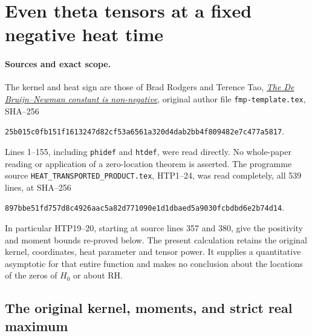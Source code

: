\section{Even theta tensors at a fixed negative heat time}
\label{sec:even-theta-tensor-concentration}

\paragraph{Sources and exact scope.}
The kernel and heat sign are those of Brad Rodgers and Terence Tao,
\href{https://arxiv.org/abs/1801.05914v5}{\emph{The De Bruijn--Newman
constant is non-negative}}, original author file
\nolinkurl{fmp-template.tex}, SHA--256
\begin{center}\small
\nolinkurl{25b015c0fb151f1613247d82cf53a6561a320d4dab2bb4f809482e7c477a5817}.
\end{center}
Lines 1--155, including \texttt{phidef} and \texttt{htdef}, were
read directly. No whole-paper reading or application of a
zero-location theorem is asserted. The programme source
\nolinkurl{HEAT_TRANSPORTED_PRODUCT.tex}, HTP1--24, was read
completely, all 539 lines, at SHA--256
\begin{center}\small
\nolinkurl{897bbe51fd757d8c4926aac5a82d771090e1d1dbaed5a9030fcbdbd6e2b74d14}.
\end{center}
In particular HTP19--20, starting at source lines 357 and 380,
give the positivity and moment bounds re-proved below. The
present calculation retains the original kernel, coordinates,
heat parameter and tensor power. It supplies a quantitative
asymptotic for that entire function and makes no conclusion
about the locations of the zeros of $H_0$ or about RH.

\subsection{The original kernel, moments, and strict real maximum}

